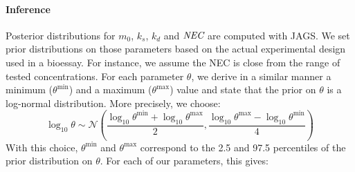 \documentclass{article}
\begin{document}
\paragraph{Inference} Posterior distributions for $m_0$, $k_s$, $k_d$ and
$\mbox{\it NEC}$ are computed with JAGS. We set prior distributions on those
parameters based on the actual experimental design used in a
bioessay. For instance, we assume the NEC is close from the range of
tested concentrations. For each parameter $\theta$, we derive in a similar
manner a minimum ($\theta^{\min}$) and a maximum ($\theta^{\max}$)
value and state that the prior on $\theta$ is a log-normal
distribution. More precisely, we choose:
$$
\log_{10} \theta \sim \mathcal{N}(\frac{\log_{10} \theta^{\min} + \log_{10} \theta^{\max}}{2},
                                 \frac{\log_{10} \theta^{\max} - \log_{10} \theta^{\min}}{4})
$$
With this choice, $\theta^{\min}$ and $\theta^{\max}$ correspond to the
2.5 and 97.5 percentiles of the prior distribution on $\theta$. For
each of our parameters, this gives:
\end{document}
